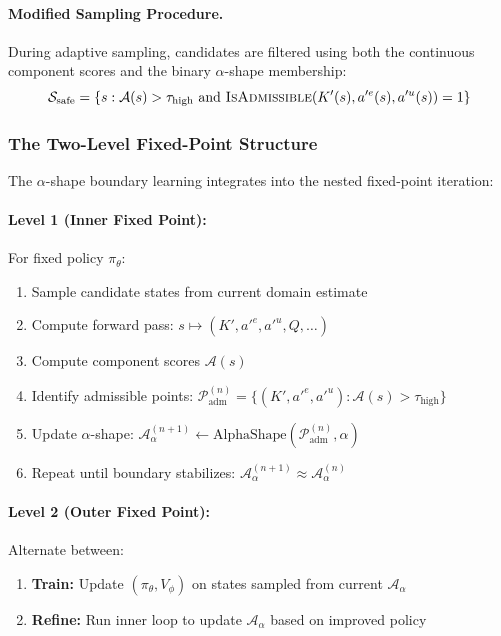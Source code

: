 \paragraph{Modified Sampling Procedure.}
During adaptive sampling, candidates are filtered using both the continuous component scores and the binary $\alpha$-shape membership:
\begin{equation}
    \mathcal{S}_{\text{safe}} = \{s : \mathcal{A}(s) > \tau_{\text{high}} \text{ and } \textsc{IsAdmissible}(K'(s), a'^e(s), a'^u(s)) = 1\}
\end{equation}


\subsubsection{The Two-Level Fixed-Point Structure}

The $\alpha$-shape boundary learning integrates into the nested fixed-point iteration:

\paragraph{Level 1 (Inner Fixed Point):} For fixed policy $\pi_\theta$:
\begin{enumerate}
    \item Sample candidate states from current domain estimate
    \item Compute forward pass: $s \mapsto (K', a'^e, a'^u, Q, \ldots)$
    \item Compute component scores $\mathcal{A}(s)$
    \item Identify admissible points: $\mathcal{P}_{\text{adm}}^{(n)} = \{(K', a'^e, a'^u) : \mathcal{A}(s) > \tau_{\text{high}}\}$
    \item Update $\alpha$-shape: $\mathcal{A}_\alpha^{(n+1)} \gets \text{AlphaShape}(\mathcal{P}_{\text{adm}}^{(n)}, \alpha)$
    \item Repeat until boundary stabilizes: $\mathcal{A}_\alpha^{(n+1)} \approx \mathcal{A}_\alpha^{(n)}$
\end{enumerate}

\paragraph{Level 2 (Outer Fixed Point):} Alternate between:
\begin{enumerate}
    \item \textbf{Train:} Update $(\pi_\theta, V_\phi)$ on states sampled from current $\mathcal{A}_\alpha$
    \item \textbf{Refine:} Run inner loop to update $\mathcal{A}_\alpha$ based on improved policy
\end{enumerate}

